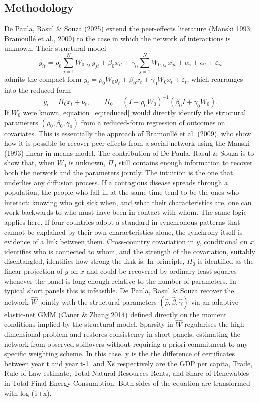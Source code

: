 \documentclass[12pt,a4paper]{article}
\begin{document}
\subsection{Methodology} De Paula, Rasul \& Souza (2025) extend the peer-effects literature (Manski 1993; Bramoullé et al., 2009) to the case in which the network of interactions is unknown. Their structural model \begin{equation} y_{it} = \rho_0 \sum_{j=1}^{N} W_{0,ij}\, y_{jt} + \beta_0 x_{it} + \gamma_0 \sum_{j=1}^{N} W_{0,ij}\, x_{jt} + \alpha_i + \alpha_t + \varepsilon_{it} \label{eq:structural} \end{equation} admits the compact form $y_t = \rho_0 W_0 y_t + \beta_0 x_t + \gamma_0 W_0 x_t + \varepsilon_t$, which rearranges into the reduced form \begin{equation} y_t = \Pi_0 x_t + \nu_t, \qquad \Pi_0 = (I - \rho_0 W_0)^{-1}(\beta_0 I + \gamma_0 W_0). \label{eq:reduced} \end{equation} If $W_0$ were known, equation~\eqref{eq:reduced} would directly identify the structural parameters $(\rho_0,\beta_0,\gamma_0)$ from a reduced-form regression of outcomes on covariates. This is essentially the approach of Bramoullé et al. (2009), who show how it is possible to recover peer effects from a social network using the Manski (1993) linear in means model. The contribution of De Paula, Rasul \& Souza is to show that, when $W_0$ is unknown, $\Pi_0$ still contains enough information to recover both the network and the parameters jointly. The intuition is the one that underlies any diffusion process. If a contagious disease spreads through a population, the people who fall ill at the same time tend to be the ones who interact: knowing who got sick when, and what their characteristics are, one can work backwards to who must have been in contact with whom. The same logic applies here. If four countries adopt a standard in synchronous patterns that cannot be explained by their own characteristics alone, the synchrony itself is evidence of a link between them. Cross-country covariation in $y$, conditional on $x$, identifies who is connected to whom, and the strength of the covariation, suitably disentangled, identifies how strong the link is. In principle, $\Pi_0$ is identified as the linear projection of $y$ on $x$ and could be recovered by ordinary least squares whenever the panel is long enough relative to the number of parameters. In typical short panels this is infeasible. De Paula, Rasul \& Souza recover the network $\hat W$ jointly with the structural parameters $(\hat\rho, \hat\beta, \hat\gamma)$ via an adaptive elastic-net GMM (Caner \& Zhang 2014) defined directly on the moment conditions implied by the structural model. Sparsity in $\hat W$ regularises the high-dimensional problem and restores consistency in short panels, estimating the network from observed spillovers without requiring a priori commitment to any specific weighting scheme.
In this case, y is the the difference of certificates between year t and year t-1, and Xs respectively are the GDP per capita, Trade, Rule of Law estimate, Total Natural Resources Rents, and Share of Renewables in Total Final Energy Consumption. Both sides of the equation are transformed with log (1+x).
\end{document}

